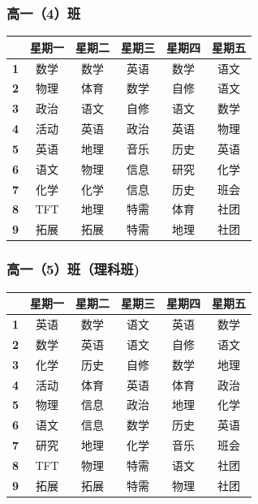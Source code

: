 \documentclass[a4paper]{article}
\begin{document}
  \clearpage

  \subsubsection{高一（4）班}

   \begin{tabular}{cccccc}
   \toprule
   & \bf 星期一 & \bf 星期二 & \bf 星期三 & \bf 星期四 & \bf 星期五 \\
   \midrule
   \bf 1 & 数学 & 数学 & 英语 & 数学 & 语文 \\
   \bf 2 & 物理 & 体育 & 数学 & 自修 & 语文 \\
   \bf 3 & 政治 & 语文 & 自修 & 语文 & 数学 \\
   \bf 4 & 活动 & 英语 & 政治 & 英语 & 物理 \\
   \bf 5 & 英语 & 地理 & 音乐 & 历史 & 英语 \\
   \midrule
   \bf 6 & 语文 & 物理 & 信息 & 研究 & 化学 \\
   \bf 7 & 化学 & 化学 & 信息 & 历史 & 班会 \\
   \bf 8 & TFT  & 地理 & 特需 & 体育 & 社团 \\
   \bf 9 & 拓展 & 拓展 & 特需 & 地理 & 社团 \\
   \bottomrule
   \end{tabular}

  \subsubsection{高一（5）班（理科班)}

   \begin{tabular}{cccccc}
   \toprule
   & \bf 星期一 & \bf 星期二 & \bf 星期三 & \bf 星期四 & \bf 星期五 \\
   \midrule
   \bf 1 & 英语 & 数学 & 语文 & 英语 & 数学 \\
   \bf 2 & 数学 & 英语 & 语文 & 自修 & 语文 \\
   \bf 3 & 化学 & 历史 & 自修 & 数学 & 地理 \\
   \bf 4 & 活动 & 体育 & 英语 & 体育 & 政治 \\
   \bf 5 & 物理 & 信息 & 政治 & 地理 & 化学 \\
   \midrule
   \bf 6 & 语文 & 信息 & 数学 & 历史 & 英语 \\
   \bf 7 & 研究 & 地理 & 化学 & 音乐 & 班会 \\
   \bf 8 & TFT  & 物理 & 特需 & 语文 & 社团 \\
   \bf 9 & 拓展 & 拓展 & 特需 & 物理 & 社团 \\
   \bottomrule
   \end{tabular}
\end{document}
